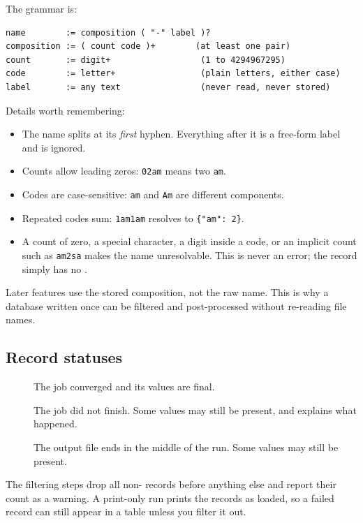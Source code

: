 The grammar is:

\begin{verbatim}
name        := composition ( "-" label )?
composition := ( count code )+        (at least one pair)
count       := digit+                  (1 to 4294967295)
code        := letter+                 (plain letters, either case)
label       := any text                (never read, never stored)
\end{verbatim}

Details worth remembering:

\begin{itemize}
  \item The name splits at its \emph{first} hyphen. Everything after it is a
        free-form label and is ignored.
  \item Counts allow leading zeros: \texttt{02am} means two \texttt{am}.
  \item Codes are case-sensitive: \texttt{am} and \texttt{Am} are different
        components.
  \item Repeated codes sum: \texttt{1am1am} resolves to
        \texttt{\{"am": 2\}}.
  \item A count of zero, a special character, a digit inside a code, or an
        implicit count such as \texttt{am2sa} makes the name unresolvable.
        This is never an error; the record simply has no .
\end{itemize}

Later features use the stored composition, not the raw name. This is
why a database written once can be filtered and post-processed without
re-reading file names.

\subsection{Record statuses}\label{sec:statuses}

\begin{description}
  \item[] The job converged and its values are final.
  \item[] The job did not finish. Some values may still be
        present, and  explains what happened.
  \item[] The output file ends in the middle of the run. Some
        values may still be present.
\end{description}

The filtering steps drop all non- records before anything else and
report their count as a warning. A print-only run prints the
records as loaded, so a failed record can still appear in a table unless you
filter it out.
